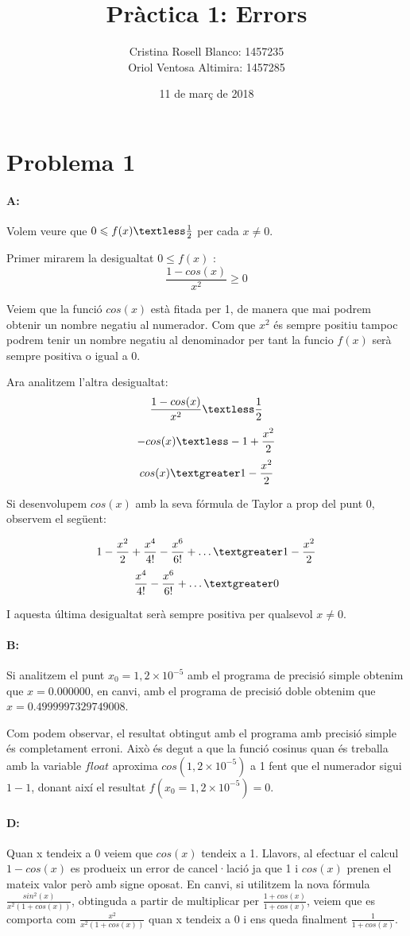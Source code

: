 \documentclass{article}
\title{Pràctica 1: Errors}
\author{Cristina Rosell Blanco: 1457235  \\ Oriol Ventosa Altimira: 1457285}
\date{11 de març de 2018}
\begin{document}
	\maketitle
	
	\newpage

	\section{Problema 1}
	\paragraph{A:} Volem veure que $0\leqslant f(x) \textless \frac{1}{2}$ per cada $x\neq0$. 
	
	Primer mirarem la desigualtat $0\leqslant f(x)$ :
	$$\frac{1-cos(x)}{x^2} \geqslant 0$$
	
	Veiem que la funció $cos(x)$ està fitada per 1, de manera que mai podrem obtenir un nombre negatiu al numerador. Com que $x^2$ és sempre positiu tampoc podrem tenir un nombre negatiu al denominador per tant la funcio $f(x)$ serà sempre positiva o igual a 0.
	
	Ara analitzem l'altra desigualtat:
	$$\frac{1-cos(x)}{x^2} \textless \frac{1}{2}$$
	$$-cos(x) \textless -1+\frac{x^2}{2}$$
	$$cos(x) \textgreater 1-\frac{x^2}{2}$$	
	
	Si desenvolupem $cos(x)$ amb la seva fórmula de Taylor a prop del punt 0, observem el següent:
	
	$$1-\frac{x^2}{2}+\frac{x^4}{4!}-\frac{x^6}{6!}+\dots \textgreater 1-\frac{x^2}{2}$$
	$$\frac{x^4}{4!}-\frac{x^6}{6!}+\dots \textgreater 0$$
	
	I aquesta última desigualtat serà sempre positiva per qualsevol $x\neq0$.
	
	\paragraph{B:} Si analitzem el punt $x_0=1,2\times 10^{-5}$ amb el programa de precisió simple obtenim que $x=0.000000$, en canvi, amb el programa de precisió doble obtenim que $x=0.4999997329749008$. 
	
	Com podem observar, el resultat obtingut amb el programa amb precisió simple és completament erroni. Això és degut a que la funció cosinus quan és treballa amb la variable $float$ aproxima $cos(1,2\times 10^{-5})$ a 1 fent que el numerador sigui $1-1$, donant així el resultat $f(x_0=1,2\times 10^{-5})=0$.
	
	\paragraph{D:} Quan x tendeix a 0 veiem que $cos(x)$ tendeix a 1. Llavors, al efectuar el calcul $1-cos(x)$ es produeix un error de cancel·lació ja que 1 i $cos(x)$ prenen el mateix valor però amb signe oposat. En canvi, si utilitzem la nova fórmula $\frac{sin^2(x)}{x^2(1+cos(x))}$, obtinguda a partir de multiplicar per $\frac{1+cos(x)}{1+cos(x)}$, veiem que es comporta com $\frac{x^2}{x^2(1+cos(x))}$ quan x tendeix a 0 i ens queda finalment $\frac{1}{1+cos(x)}$. 
	
\end{document}
